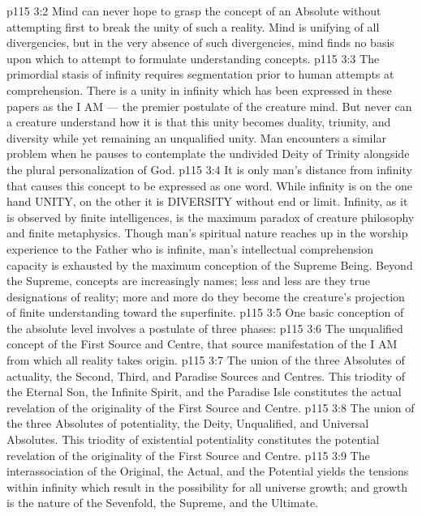 \vs p115 3:2 Mind can never hope to grasp the concept of an Absolute without attempting first to break the unity of such a reality. Mind is unifying of all divergencies, but in the very absence of such divergencies, mind finds no basis upon which to attempt to formulate understanding concepts.
\vs p115 3:3 The primordial stasis of infinity requires segmentation prior to human attempts at comprehension. There is a unity in infinity which has been expressed in these papers as the I AM --- the premier postulate of the creature mind. But never can a creature understand how it is that this unity becomes duality, triunity, and diversity while yet remaining an unqualified unity. Man encounters a similar problem when he pauses to contemplate the undivided Deity of Trinity alongside the plural personalization of God.
\vs p115 3:4 It is only man’s distance from infinity that causes this concept to be expressed as one word. While infinity is on the one hand UNITY, on the other it is DIVERSITY without end or limit. Infinity, as it is observed by finite intelligences, is the maximum paradox of creature philosophy and finite metaphysics. Though man’s spiritual nature reaches up in the worship experience to the Father who is infinite, man’s intellectual comprehension capacity is exhausted by the maximum conception of the Supreme Being. Beyond the Supreme, concepts are increasingly names; less and less are they true designations of reality; more and more do they become the creature’s projection of finite understanding toward the superfinite.
\vs p115 3:5 \pc One basic conception of the absolute level involves a postulate of three phases:
\vs p115 3:6 \bibnobreakspace {} The unqualified concept of the First Source and Centre, that source manifestation of the I AM from which all reality takes origin.
\vs p115 3:7 \bibnobreakspace {} The union of the three Absolutes of actuality, the Second, Third, and Paradise Sources and Centres. This triodity of the Eternal Son, the Infinite Spirit, and the Paradise Isle constitutes the actual revelation of the originality of the First Source and Centre.
\vs p115 3:8 \bibnobreakspace {} The union of the three Absolutes of potentiality, the Deity, Unqualified, and Universal Absolutes. This triodity of existential potentiality constitutes the potential revelation of the originality of the First Source and Centre.
\vs p115 3:9 \pc The interassociation of the Original, the Actual, and the Potential yields the tensions within infinity which result in the possibility for all universe growth; and growth is the nature of the Sevenfold, the Supreme, and the Ultimate.
